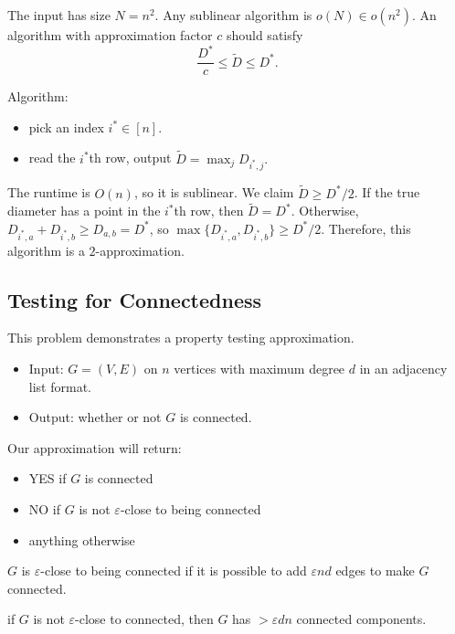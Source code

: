 The input has size $N=n^2$. Any sublinear algorithm is $o(N)\in o(n^2)$. An algorithm with approximation factor $c$ should satisfy 
\[\frac{D^*}{c}\leq \tilde{D} \leq D^*.\]

\hrulebar 

Algorithm: 
\begin{itemize}
    \item pick an index $i^*\in [n]$.
    \item read the $i^*$th row, output $\tilde{D} = \max_{j}D_{i^*,j}.$
\end{itemize}

The runtime is $O(n)$, so it is sublinear. We claim $\tilde{D}\geq D^*/2$. If the true diameter has a point in the $i^*$th row, then $\tilde{D}=D^*$. Otherwise, $D_{i^*,a}+D_{i^*,b}\geq D_{a,b}=D^*$, so $\max\{D_{i^*,a}, D_{i^*,b}\}\geq D^*/2$. Therefore, this algorithm is a $2$-approximation. 

\subsection{Testing for Connectedness}

This problem demonstrates a property testing approximation. 

\begin{itemize}
    \item Input: $G=(V,E)$ on $n$ vertices with maximum degree $d$ in an adjacency list format. 
    \item Output: whether or not $G$ is connected. 
\end{itemize}

\noindent Our approximation will return: 
\begin{itemize}
    \item YES if $G$ is connected
    \item NO if $G$ is not $\varepsilon$-close to being connected
    \item anything otherwise
\end{itemize}

\begin{definition}

$G$ is $\varepsilon$-close to being connected if it is possible to add $\varepsilon nd$ edges to make $G$ connected. 
\end{definition}

\begin{theorem}
\claimlabel

if $G$ is not $\varepsilon$-close to connected, then $G$ has $>\varepsilon dn$ connected components.
\end{theorem}

